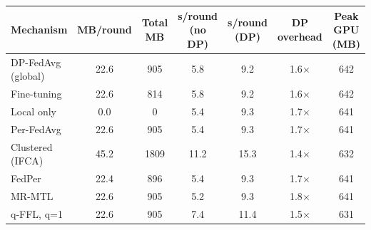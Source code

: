 \begin{tabular}{lcccccc}
\toprule
Mechanism & MB/round & Total MB & s/round (no DP) & s/round (DP) & DP overhead & Peak GPU (MB) \\
\midrule
DP-FedAvg (global) & 22.6 & 905 & 5.8 & 9.2 & 1.6$\times$ & 642 \\
Fine-tuning & 22.6 & 814 & 5.8 & 9.2 & 1.6$\times$ & 642 \\
Local only & 0.0 & 0 & 5.4 & 9.3 & 1.7$\times$ & 641 \\
Per-FedAvg & 22.6 & 905 & 5.4 & 9.3 & 1.7$\times$ & 641 \\
Clustered (IFCA) & 45.2 & 1809 & 11.2 & 15.3 & 1.4$\times$ & 632 \\
FedPer & 22.4 & 896 & 5.4 & 9.3 & 1.7$\times$ & 641 \\
MR-MTL & 22.6 & 905 & 5.2 & 9.3 & 1.8$\times$ & 641 \\
q-FFL, q=1 & 22.6 & 905 & 7.4 & 11.4 & 1.5$\times$ & 631 \\
\bottomrule
\end{tabular}
